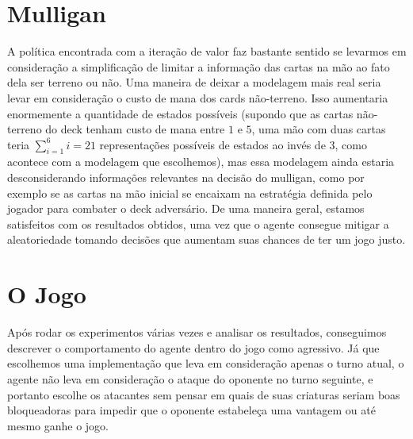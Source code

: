 \documentclass[dvipsnames]{book}
\begin{document}
\section{Mulligan}
A política encontrada com a iteração de valor faz bastante sentido se levarmos em consideração a
simplificação de limitar a informação das cartas na mão ao fato dela ser terreno ou não. Uma
maneira de deixar a modelagem mais real seria levar em consideração o custo de mana dos cards
não-terreno. Isso aumentaria enormemente a quantidade de estados possíveis (supondo que as cartas
não-terreno do deck tenham custo de mana entre $1$ e $5$, uma mão com duas cartas teria
$\sum\limits_{i=1}^{6}i = 21$ representações possíveis de estados ao invés de $3$, como acontece
com a modelagem que escolhemos), mas essa modelagem ainda estaria desconsiderando informações
relevantes na decisão do mulligan, como por exemplo se as cartas na mão inicial se encaixam na
estratégia definida pelo jogador para combater o deck adversário. De uma maneira geral, estamos
satisfeitos com os resultados obtidos, uma vez que o agente consegue mitigar a aleatoriedade
tomando decisões que aumentam suas chances de ter um jogo justo.

\section{O Jogo}
Após rodar os experimentos várias vezes e analisar os resultados, conseguimos descrever o
comportamento do agente dentro do jogo como agressivo. Já que escolhemos uma implementação que
leva em consideração apenas o turno atual, o agente não leva em consideração o ataque do oponente
no turno seguinte, e portanto escolhe os atacantes sem pensar em quais de suas criaturas seriam
boas bloqueadoras para impedir que o oponente estabeleça uma vantagem ou até mesmo ganhe o jogo.
\end{document}
